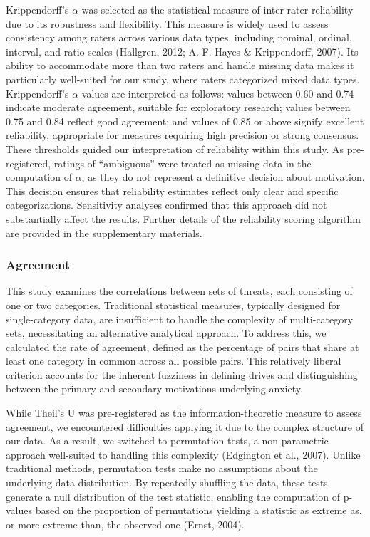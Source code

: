 \documentclass[
  man,floatsintext]{apa7}
\begin{document}
Krippendorff's \(\alpha\) was selected as the statistical measure of inter-rater reliability due to its robustness and flexibility.
This measure is widely used to assess consistency among raters across various data types, including nominal, ordinal, interval, and ratio scales (Hallgren, 2012; A. F. Hayes \& Krippendorff, 2007).
Its ability to accommodate more than two raters and handle missing data makes it particularly well-suited for our study, where raters categorized mixed data types.
Krippendorff's \(\alpha\) values are interpreted as follows: values between 0.60 and 0.74 indicate moderate agreement, suitable for exploratory research; values between 0.75 and 0.84 reflect good agreement; and values of 0.85 or above signify excellent reliability, appropriate for measures requiring high precision or strong consensus.
These thresholds guided our interpretation of reliability within this study.
As pre-registered, ratings of ``ambiguous'' were treated as missing data in the computation of \(\alpha\), as they do not represent a definitive decision about motivation.
This decision ensures that reliability estimates reflect only clear and specific categorizations.
Sensitivity analyses confirmed that this approach did not substantially affect the results.
Further details of the reliability scoring algorithm are provided in the supplementary materials.

\subsubsection{Agreement}\label{agreement}

This study examines the correlations between sets of threats, each consisting of one or two categories.
Traditional statistical measures, typically designed for single-category data, are insufficient to handle the complexity of multi-category sets, necessitating an alternative analytical approach.
To address this, we calculated the rate of agreement, defined as the percentage of pairs that share at least one category in common across all possible pairs.
This relatively liberal criterion accounts for the inherent fuzziness in defining drives and distinguishing between the primary and secondary motivations underlying anxiety.

While Theil's U was pre-registered as the information-theoretic measure to assess agreement, we encountered difficulties applying it due to the complex structure of our data.
As a result, we switched to permutation tests, a non-parametric approach well-suited to handling this complexity (Edgington et al., 2007).
Unlike traditional methods, permutation tests make no assumptions about the underlying data distribution.
By repeatedly shuffling the data, these tests generate a null distribution of the test statistic, enabling the computation of p-values based on the proportion of permutations yielding a statistic as extreme as, or more extreme than, the observed one (Ernst, 2004).
\end{document}
